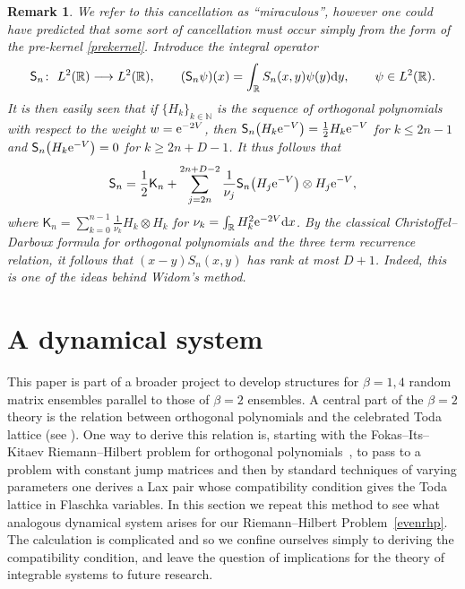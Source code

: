 \documentclass[pdftex]{sigma}
\numberwithin{equation}{section}
\newtheorem{Remark}[Theorem]{Remark}
\begin{document}
\begin{Remark}
We refer to this cancellation as \enquote{miraculous}, however one could have predicted that some sort of cancellation must occur simply from the form of the pre-kernel \eqref{prekernel}. Introduce the integral operator
\begin{align*}
\mathsf{S}_n \colon\ L^2(\mathbb{R}) \longrightarrow L^2(\mathbb{R}),\qquad
(\mathsf{S}_n \psi)(x) = \int_\mathbb{R} S_n(x,y) \psi(y) {\rm d}y,\qquad \psi \in L^2(\mathbb{R}).
\end{align*}
It is then easily seen that if $\{ H_k \}_{k \in \mathbb{N}}$ is the sequence of \textit{orthogonal} polynomials with respect to the weight $w = {\rm e}^{-2V}$, then $\mathsf{S}_n \big( H_k {\rm e}^{-V}\big) = \frac{1}{2} H_k {\rm e}^{-V}$ for $k \leq 2n-1$ and $\mathsf{S}_n \big( H_k {\rm e}^{-V}\big) = 0$ for $k \geq 2n+D-1$. It thus follows that
\begin{equation*}
\mathsf{S}_n = \frac{1}{2} \mathsf{K}_n + \sum_{j=2n}^{2n+D-2} \frac{1}{\nu_j} \mathsf{S}_n\big(H_j {\rm e}^{-V}\big) \otimes H_j {\rm e}^{-V},
\end{equation*}
where $\mathsf{K}_n = \sum_{k=0}^{n-1} \frac{1}{\nu_k} H_k \otimes H_k$ for $\nu_k = \int_\mathbb{R} H_k^2 {\rm e}^{-2V} {\rm d}x$. By the classical Christoffel--Darboux formula for orthogonal polynomials and the three term recurrence relation, it follows that ${(x-y) S_n(x,y)}$ has rank at most $D+1$. Indeed, this is one of the ideas behind Widom's method.
\end{Remark}

\section{A dynamical system}\label{dynamicsection}

This paper is part of a broader project to develop structures for $\beta = 1,4$ random matrix ensembles parallel to those of $\beta = 2$ ensembles. A central part of the $\beta = 2$ theory is the relation between orthogonal polynomials and the celebrated Toda lattice (see \cite[Chapter 2]{deiftbook}). One way to derive this relation is, starting with the Fokas--Its--Kitaev Riemann--Hilbert problem for orthogonal polynomials~\cite{fokas}, to pass to a problem with constant jump matrices and then by standard techniques of varying parameters one derives a Lax pair whose compatibility condition gives the Toda lattice in Flaschka variables. In this section we repeat this method to see what analogous dynamical system arises for our Riemann--Hilbert Problem~\ref{evenrhp}. The calculation is complicated and so we confine ourselves simply to deriving the compatibility condition, and leave the question of implications for the theory of integrable systems to future research.
\end{document}
